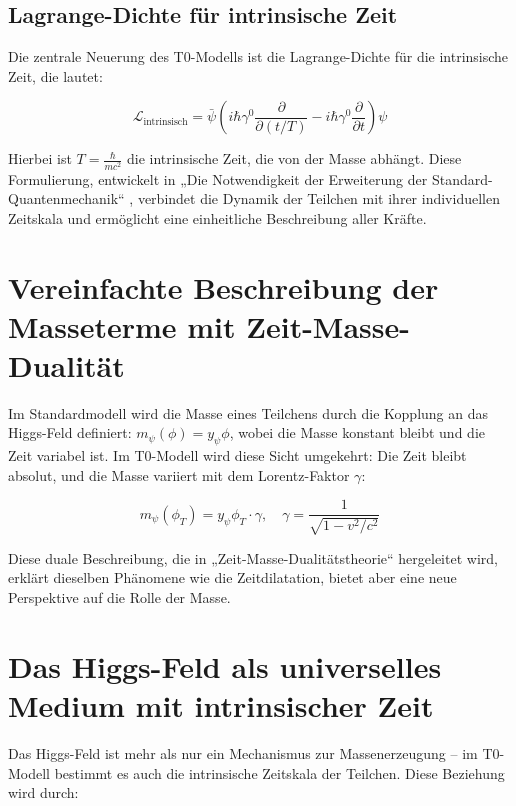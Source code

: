 \documentclass[a4paper,12pt]{article}
\begin{document}
	\subsection{Lagrange-Dichte für intrinsische Zeit}
	
	Die zentrale Neuerung des T0-Modells ist die Lagrange-Dichte für die intrinsische Zeit, die lautet:
	
	\begin{equation}
		\mathcal{L}_\text{intrinsisch} = \bar{\psi} \left( i\hbar \gamma^0 \frac{\partial}{\partial (t/T)} - i\hbar \gamma^0 \frac{\partial}{\partial t} \right) \psi
	\end{equation}
	
	Hierbei ist \(T = \frac{\hbar}{m c^2}\) die intrinsische Zeit, die von der Masse abhängt. Diese Formulierung, entwickelt in „Die Notwendigkeit der Erweiterung der Standard-Quantenmechanik“ \cite{pascher_quantum_2025}, verbindet die Dynamik der Teilchen mit ihrer individuellen Zeitskala und ermöglicht eine einheitliche Beschreibung aller Kräfte.
	
	\section{Vereinfachte Beschreibung der Masseterme mit Zeit-Masse-Dualität}
	
	Im Standardmodell wird die Masse eines Teilchens durch die Kopplung an das Higgs-Feld definiert: \(m_\psi(\phi) = y_\psi \phi\), wobei die Masse konstant bleibt und die Zeit variabel ist. Im T0-Modell wird diese Sicht umgekehrt: Die Zeit bleibt absolut, und die Masse variiert mit dem Lorentz-Faktor \(\gamma\):
	
	\begin{equation}
		m_\psi(\phi_T) = y_\psi \phi_T \cdot \gamma, \quad \gamma = \frac{1}{\sqrt{1 - v^2/c^2}}
	\end{equation}
	
	Diese duale Beschreibung, die in „Zeit-Masse-Dualitätstheorie“ \cite{pascher_params_2025} hergeleitet wird, erklärt dieselben Phänomene wie die Zeitdilatation, bietet aber eine neue Perspektive auf die Rolle der Masse.
	
	\section{Das Higgs-Feld als universelles Medium mit intrinsischer Zeit}
	
	Das Higgs-Feld ist mehr als nur ein Mechanismus zur Massenerzeugung – im T0-Modell bestimmt es auch die intrinsische Zeitskala der Teilchen. Diese Beziehung wird durch:
	
\end{document}
